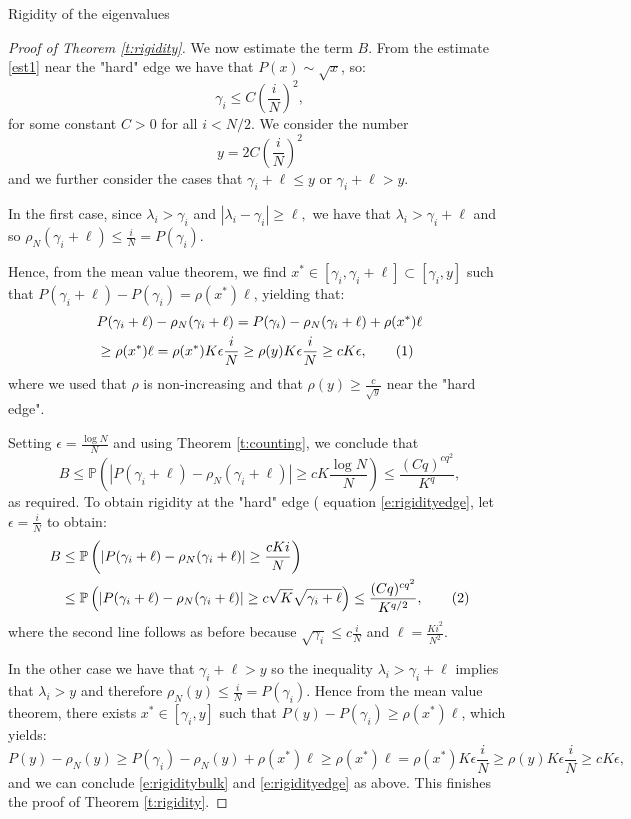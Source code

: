 \documentclass[11pt, a4paper, oneside]{book}
\numberwithin{equation}{chapter}
\newcommand{\PP}{\mathbb P}
\newcommand\numberthis{\addtocounter{equation}{1}\tag{\theequation}}
\begin{document}
\begin{section}{Rigidity of the eigenvalues}
\begin{proof}[Proof of Theorem \ref{t:rigidity}]
We now estimate the term $B.$ From the estimate \eqref{est1} near the "hard" edge we have that $P(x) \sim \sqrt{x}$, so:
%
$$ \gamma_i \leq C \left ( \frac{i}{N} \right )^2 ,$$
%
for some constant $C>0$ for all $i < N/2$. We consider the number
$$ 
y = 2C \left ( \frac{i}{N} \right )^2 
$$
and we further consider the cases that $\gamma_i + \ell \leq y $ or $ \gamma_i + \ell > y .$

In the first case, since $\lambda_i > \gamma_i $ and $| \lambda_i - \gamma_i | \geq \ell ,$ we have that  $\lambda_i > \gamma_i + \ell $ and so $ \rho_N( \gamma_i + \ell) \leq \frac{i}{N} = P(\gamma_i).$

Hence, from the mean value theorem, we find $x^* \in [\gamma_i , \gamma_i + \ell ] \subset [\gamma_i , y ] $ such that $P(\gamma_i + \ell) - P(\gamma_i ) = \rho(x^*) \ell$, yielding that:
%
\begin{align*}
&P(\gamma_i + \ell) - \rho_N(\gamma_i + \ell) = P(\gamma_i) - \rho_N(\gamma_i + \ell) + \rho(x^*)\ell \\
&\geq \rho(x^*) \ell = \rho(x^*)  K\epsilon \frac{i}{N} \geq \rho(y) K\epsilon \frac{i}{N} \geq  c K\epsilon, \numberthis
\end{align*}
%
where we used that $\rho$ is non-increasing and that $\rho(y) \geq \frac{c}{\sqrt{y}}$ near the "hard edge".

Setting $\epsilon = \frac{\log N}{N}$ and using Theorem \ref{t:counting}, we conclude that
%
\begin{equation} B \leq \PP \left( |P(\gamma_i + \ell) - \rho_N(\gamma_i + \ell) | \geq cK \frac{ \log N}{N}\right)\leq \frac{(Cq)^{cq^2}}{K^q},
\end{equation}
%
as required. To obtain rigidity at the "hard" edge ( equation \eqref{e:rigidityedge}, let $\epsilon = \frac{i}{N} $ to obtain:
%
\begin{align*}
B &\leq \PP \left( |P(\gamma_i + \ell) - \rho_N(\gamma_i + \ell) | \geq \frac{cKi}{N} \right) \\
&\leq \PP \left( |P(\gamma_i + \ell) - \rho_N(\gamma_i + \ell) | \geq c\sqrt{K} \sqrt{\gamma_i + \ell}  \right)
\leq \frac{(Cq)^{cq^2}}{K^{q/2}} , \numberthis
\end{align*}
%
where the second line follows as before because $\sqrt{\gamma_i} \leq c\frac{i}{N}$ and $\ell = \frac{K i^2}{N^2}$.

In the other case we have that $ \gamma_i + \ell > y$ so the inequality $\lambda_i > \gamma_i + \ell$ implies that $\lambda_i > y$ and therefore $\rho_N (y) \leq \frac{i}{N} = P(\gamma_i).$ Hence from the mean value theorem, there exists $x^* \in [\gamma_i, y]$ such that $P(y) - P(\gamma_i) \geq \rho(x^*) \ell$, which yields:
%
\begin{equation*}
P(y) - \rho_N(y) \geq P(\gamma_i) - \rho_N(y) + \rho(x^*)\ell \geq \rho(x^*) \ell = \rho(x^*)  K \epsilon \frac{i}{N} \geq \rho(y) K \epsilon \frac{i}{N} \geq  c K \epsilon,
\end{equation*}
%
and we can conclude \eqref{e:rigiditybulk} and \eqref{e:rigidityedge} as above. This finishes the proof of Theorem \ref{t:rigidity}.
\end{proof}
%
\end{section}
\end{document}
